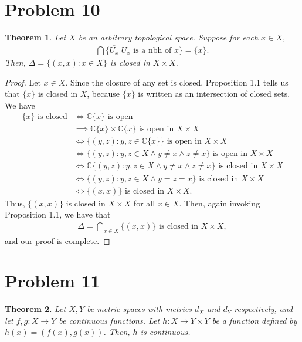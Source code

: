 \documentclass[10pt,a4paper]{article}
\author{Jeremiah Givens}
\theoremstyle{theorem}
\newtheorem{theorem}{Theorem}
\theoremstyle{definition}
\begin{document}
\section*{Problem 10}
\begin{theorem}
Let $X$ be an arbitrary topological space. Suppose for each $x \in X$, 
\begin{align*}
\bigcap \{\overline{U_x}| U_x \text{ is a nbh of } x \} = \{x\}.
\end{align*}
Then, $\Delta = \{(x,x): x \in X \}$ is closed in $X \times X$.
\end{theorem}

\begin{proof}
Let $x \in X$. Since the closure of any set is closed,  Proposition 1.1 tells us that $\{x\}$ is closed in $X$, because $\{x\}$ is written as an intersection of closed sets. We have
\begin{align*}
\{x \} \text{ is closed} &\iff \mathbb{C}\{x \} \text{ is open}\\
&\implies \mathbb{C}\{x \} \times \mathbb{C}\{x \} \text{ is open in } X \times X\\
&\iff \{(y, z): y,z \in \mathbb{C}\{x\} \} \text{ is open in } X \times X\\
&\iff \{(y, z): y,z \in X \land y \not = x \land z \not = x\} \text{ is open in } X \times X\\
&\iff \mathbb{C} \{(y, z): y,z \in X \land y \not = x \land z \not = x\} \text{ is closed in } X \times X\\
&\iff \{(y, z): y,z \in X \land y = z = x\} \text{ is closed in } X \times X\\
&\iff \{(x, x)\} \text{ is closed in } X \times X.
\end{align*}
Thus, $\{(x, x)\}$ is closed in $X \times X$ for all $x \in X$. Then, again invoking Proposition 1.1, we have that
\begin{align*}
\Delta = \bigcap_{x \in X} \{(x, x) \} \text{ is closed in } X \times X,
\end{align*}
and our proof is complete.
\end{proof}

\section*{Problem 11}
\begin{theorem}
Let $X, Y$ be metric spaces with metrics $d_X$ and $d_Y$ respectively, and let $f,g:X \to Y$ be continuous functions. Let $h:X \to Y\times Y$ be a function defined by $h(x) = (f(x), g(x))$. Then, $h$ is continuous.
\end{theorem}
\end{document}
